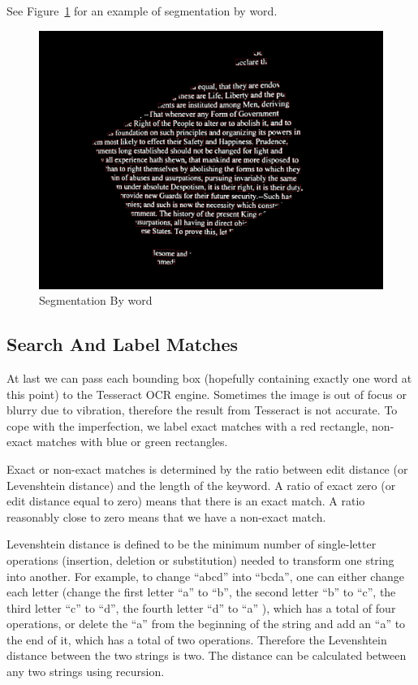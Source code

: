 \documentclass[conference]{IEEEtran}
\begin{document}
See Figure~\ref{wordbbox} for an example of segmentation by word.

\begin{figure}
\center
\includegraphics[scale=0.10]{word_with_bounding_box.jpg}
\caption{Segmentation By word}
\label{wordbbox}
\end{figure}

\subsection{Search And Label Matches}
At last we can pass each bounding box (hopefully containing exactly one word at this point) to the Tesseract OCR engine.  Sometimes the image is out of focus or blurry due to vibration, therefore the result from Tesseract is not accurate.  To cope with the imperfection, we label exact matches with a red rectangle, non-exact matches with blue or green rectangles.

Exact or non-exact matches is determined by the ratio between edit distance (or Levenshtein distance) and the length of the keyword.  A ratio of exact zero (or edit distance equal to zero) means that there is an exact match.  A ratio reasonably close to zero means that we have a non-exact match.

Levenshtein distance is defined to be the minimum number of single-letter operations (insertion, deletion or substitution) needed to transform one string into another.  For example, to change ``abcd'' into ``bcda'', one can either change each letter (change the first letter ``a'' to ``b'', the second letter ``b'' to ``c'', the third letter ``c'' to ``d'', the fourth letter ``d'' to ``a'' ), which has a total of four operations, or delete the ``a'' from the beginning of the string and add an ``a'' to the end of it, which has a total of two operations.  Therefore the Levenshtein distance between the two strings is two.  The distance can be calculated between any two strings using recursion.
\end{document}
